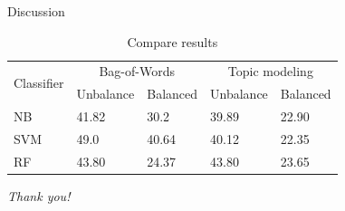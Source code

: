\documentclass{beamer}
\begin{document}
\begin{frame}{Discussion}
\begin{table}[]
\caption{Compare results} \label{tbl:topic-modeling-metric}
\begin{tabular}{|l|l|l|l|l|}
\hline
\multicolumn{1}{|c|}{\multirow{2}{*}{Classifier}} & \multicolumn{2}{c|}{Bag-of-Words} & \multicolumn{2}{c|}{Topic modeling} \\ \cline{2-5} 
\multicolumn{1}{|c|}{} & Unbalance & Balanced & Unbalance & Balanced \\ \hline
NB & 41.82 & 30.2 & 39.89 & 22.90 \\ \hline
SVM & 49.0 & 40.64 & 40.12 & 22.35 \\ \hline
RF & 43.80 & 24.37 & 43.80 & 23.65 \\ \hline
\end{tabular}
\end{table}
\end{frame}

\begin{frame}{}
  \centering \Large
  \emph{Thank you!}
\end{frame}

\end{document}
